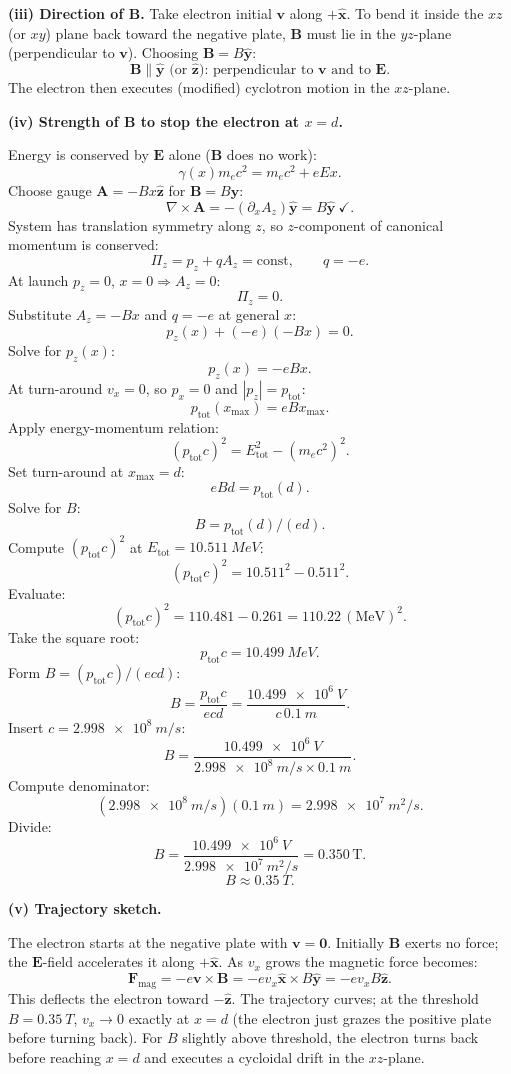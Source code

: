 \documentclass[11pt]{article}
\begin{document}
\textbf{(iii) Direction of $\bm B$.} Take electron initial $\bm v$ along $+\hat{\bm x}$. To bend it inside the $xz$ (or $xy$) plane back toward the negative plate, $\bm B$ must lie in the $yz$-plane (perpendicular to $\bm v$). Choosing $\bm B = B\hat{\bm y}$:
\[ \boxed{\;\bm B \parallel \hat{\bm y}\text{ (or }\hat{\bm z}\text{): perpendicular to }\bm v\text{ and to }\bm E.\;} \]
The electron then executes (modified) cyclotron motion in the $xz$-plane.

\textbf{(iv) Strength of $\bm B$ to stop the electron at $x=d$.}

Energy is conserved by $\bm E$ alone ($\bm B$ does no work):
\[ \gamma(x)m_e c^2 = m_e c^2 + eEx. \]
Choose gauge $\bm A = -Bx\hat{\bm z}$ for $\bm B = B\hat{\bm y}$:
\[ \nabla\times\bm A = -(\partial_x A_z)\hat{\bm y} = B\hat{\bm y}\ \checkmark. \]
System has translation symmetry along $z$, so $z$-component of canonical momentum is conserved:
\[ \Pi_z = p_z + qA_z = \text{const},\qquad q=-e. \]
At launch $p_z=0$, $x=0\Rightarrow A_z=0$:
\[ \Pi_z = 0. \]
Substitute $A_z = -Bx$ and $q = -e$ at general $x$:
\[ p_z(x) + (-e)(-Bx) = 0. \]
Solve for $p_z(x)$:
\[ p_z(x) = -eBx. \]
At turn-around $v_x = 0$, so $p_x=0$ and $|p_z| = p_\text{tot}$:
\[ p_\text{tot}(x_\text{max}) = eBx_\text{max}. \]
Apply energy-momentum relation:
\[ (p_\text{tot}c)^2 = E_\text{tot}^2 - (m_ec^2)^2. \]
Set turn-around at $x_\text{max} = d$:
\[ eBd = p_\text{tot}(d). \]
Solve for $B$:
\[ B = p_\text{tot}(d)/(ed). \]
Compute $(p_\text{tot}c)^2$ at $E_\text{tot}=\SI{10.511}{MeV}$:
\[ (p_\text{tot}c)^2 = 10.511^2 - 0.511^2. \]
Evaluate:
\[ (p_\text{tot}c)^2 = 110.481 - 0.261 = 110.22\,(\text{MeV})^2. \]
Take the square root:
\[ p_\text{tot}c = \SI{10.499}{MeV}. \]
Form $B = (p_\text{tot}c)/(ec d)$:
\[ B = \frac{p_\text{tot}c}{ecd} = \frac{\SI{10.499e6}{V}}{c\,\SI{0.1}{m}}. \]
Insert $c = \SI{2.998e8}{m/s}$:
\[ B = \frac{\SI{10.499e6}{V}}{\SI{2.998e8}{m/s}\times\SI{0.1}{m}}. \]
Compute denominator:
\[ (\SI{2.998e8}{m/s})(\SI{0.1}{m}) = \SI{2.998e7}{m^2/s}. \]
Divide:
\[ B = \frac{\SI{10.499e6}{V}}{\SI{2.998e7}{m^2/s}} = 0.350\,\text{T}. \]
\[ \boxed{\;B \approx \SI{0.35}{T}.\;} \]

\textbf{(v) Trajectory sketch.}

The electron starts at the negative plate with $\bm v=\bm 0$. Initially $\bm B$ exerts no force; the $\bm E$-field accelerates it along $+\hat{\bm x}$. As $v_x$ grows the magnetic force becomes:
\[ \bm F_\text{mag} = -e\bm v\times\bm B = -e v_x\hat{\bm x}\times B\hat{\bm y} = -ev_xB\hat{\bm z}. \]
This deflects the electron toward $-\hat{\bm z}$. The trajectory curves; at the threshold $B = \SI{0.35}{T}$, $v_x\to 0$ exactly at $x=d$ (the electron just grazes the positive plate before turning back). For $B$ slightly above threshold, the electron turns back before reaching $x=d$ and executes a cycloidal drift in the $xz$-plane.
\end{document}
